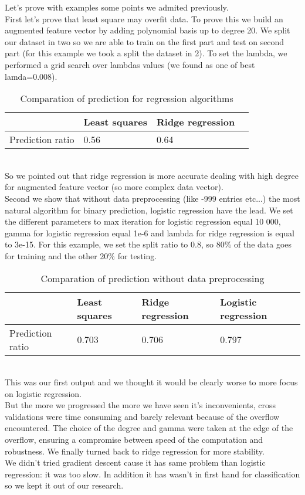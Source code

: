 \documentclass[10pt,conference,compsocconf]{IEEEtran}
\begin{document}
Let's prove with examples some points we admited previously.\\ First let's prove that least square may overfit data. To prove this we build an augmented feature vector by adding polynomial basis up to degree 20. We split our dataset in two so we are able to train on the first part and test on second part (for this example we took a split the dataset in 2). To set the lambda, we performed a grid search over lambdas values (we found as one of best lamda=0.008).\\
\begin{table}[h]
\centering
\caption{Comparation of prediction for regression algorithms}
\label{my-label}
\begin{tabular}{|l|l|l|l|}
\hline
                 & Least squares & Ridge regression \\ \hline
Prediction ratio & 0.56          & 0.64            \\ \hline
\end{tabular}
\end{table}
\\So we pointed out that ridge regression is more accurate dealing with high degree for augmented feature vector (so more complex data vector).\\
Second we show that without data preprocessing (like -999 entries etc...) the most natural algorithm for binary prediction, logistic regression have the lead.
We set the different parameters to max iteration for logistic regression equal 10 000, gamma for logistic regression equal 1e-6 and lambda for ridge regression is equal to 3e-15. For this example, we set the split ratio to 0.8, so 80\% of the data goes for training and the other 20\% for testing.\\
\begin{table}[h]
\centering
\caption{Comparation of prediction without data preprocessing}
\label{my-label}
\begin{tabular}{|l|l|l|l|}
\hline
                 & Least squares & Ridge regression & Logistic regression \\ \hline
Prediction ratio & 0.703         & 0.706            & 0.797               \\ \hline
\end{tabular}
\end{table}
\\This was our first output and we thought it would be clearly worse to more focus on logistic regression.\\
But the more we progressed the more we have seen it's inconvenients, cross validations were time consuming and barely relevant because of the  overflow encountered. The choice of the degree and gamma were taken at the edge of the overflow, ensuring a compromise between speed of the computation and robustness.
We finally turned back to ridge regression for more stability.\\
We didn't tried gradient descent cause it has same problem than logistic regression: it was too slow. In addition it has wasn't in first hand for classification so we kept it out of our research.\\
\end{document}
